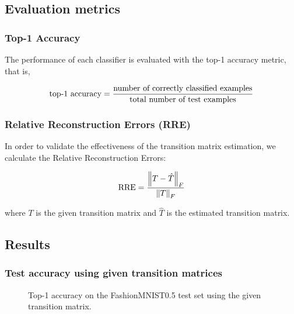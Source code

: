 \documentclass{article} %
\begin{document}
\subsection{Evaluation metrics}
\subsubsection{Top-1 Accuracy}
The performance of each classifier is evaluated with the top-1 accuracy metric, that is,

\begin{equation}
\textup{top-1 accuracy} = \frac{\textup{number of correctly classified examples}}{\textup{total number of test examples}}
\end{equation}

\subsubsection{Relative Reconstruction Errors (RRE)}
In order to validate the effectiveness of the transition matrix estimation, we calculate the Relative Reconstruction Errors:

\begin{equation}
\textup{RRE} = \frac{\left\|T - \hat{T}\right\|_F}{\left\|T\right\|_F}
\end{equation}

where $T$ is the given transition matrix and $\hat{T}$ is the estimated transition matrix.


\subsection{Results}
\subsubsection{Test accuracy using given transition matrices}
\begin{figure}\caption{
  Top-1 accuracy on the FashionMNIST0.5 test set using the given transition matrix.
  \label{fig:acc-FashionMNIST0.5}
}\end{figure}
\end{document}
